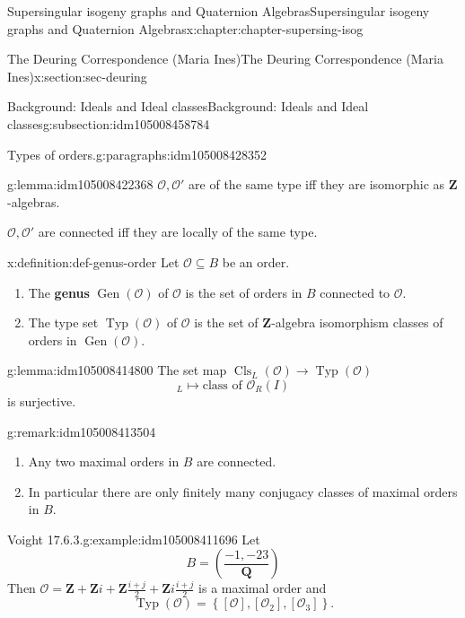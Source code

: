 \documentclass[oneside,10pt,]{book}
\newcommand{\terminology}[1]{\textbf{#1}}
\numberwithin{equation}{section}
\newcommand{\legendre}[2]{\left(\frac{#1}{#2}\right)}
\newcommand{\lb}{[}
\newcommand{\rb}{]}
\newcommand{\ZZ}{\mathbf{Z}}
\newcommand{\QQ}{\mathbf{Q}}
\newcommand{\ints}{\mathcal{O}}
\begin{document}
\begin{chapterptx}{Supersingular isogeny graphs and Quaternion Algebras}{}{Supersingular isogeny graphs and Quaternion Algebras}{}{}{x:chapter:chapter-supersing-isog}
\begin{sectionptx}{The Deuring Correspondence (Maria Ines)}{}{The Deuring Correspondence (Maria Ines)}{}{}{x:section:sec-deuring}
\begin{subsectionptx}{Background: Ideals and Ideal classes}{}{Background: Ideals and Ideal classes}{}{}{g:subsection:idm105008458784}
\begin{paragraphs}{Types of orders.}{g:paragraphs:idm105008428352}
\begin{lemma}{}{}{g:lemma:idm105008422368}
\(\ints,\ints'\) are of the same type iff they are isomorphic as \(\ZZ\)-algebras.%
\par
\(\ints,\ints'\) are connected iff they are locally of the same type.%
\end{lemma}
\begin{definition}{}{x:definition:def-genus-order}%
Let \(\ints \subseteq B\) be an order.%
\begin{enumerate}
\item{}The \terminology{genus} \(\operatorname{Gen}(\ints)\) of \(\ints \) is the set of orders in \(B \) connected to \(\ints\).%
\item{}The type set \(\operatorname{Typ}(\ints)\) of \(\ints\) is the set of \(\ZZ\)-algebra isomorphism classes of orders in \(\operatorname{Gen} (\ints)\).%
\end{enumerate}
%
\end{definition}
\begin{lemma}{}{}{g:lemma:idm105008414800}%
The set map \(\operatorname{Cls}_L(\ints) \to \operatorname{Typ}(\ints)\)%
\begin{equation*}
[ I]_L \mapsto \text{class of } \ints_R(I)
\end{equation*}
is surjective.%
\end{lemma}
\begin{remark}{}{g:remark:idm105008413504}%
%
\begin{enumerate}
\item{}Any two maximal orders in \(B\) are connected.%
\item{}In particular there are only finitely many conjugacy classes of maximal orders in \(B\).%
\end{enumerate}
%
\end{remark}
\begin{example}{Voight 17.6.3.}{g:example:idm105008411696}%
Let%
\begin{equation*}
B = \legendre{-1,-23}{\QQ}
\end{equation*}
Then \(\ints=  \ZZ +  \ZZ i + \ZZ \frac{i+j}{2} + \ZZ i \frac{i+j}{2}\) is a maximal order and%
\begin{equation*}
\operatorname{Typ}(\ints) =  \left\{ \lb \ints \rb , \lb \ints_2 \rb , \lb \ints_3 \rb \right\}\text{.}
\end{equation*}
%
\end{example}
\end{paragraphs}%
\end{subsectionptx}
%
%
\typeout{************************************************}

\end{sectionptx}
\end{chapterptx}
\end{document}

